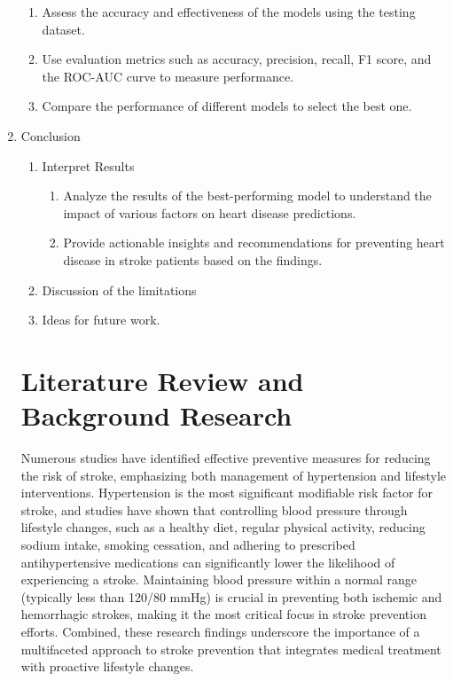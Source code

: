 \documentclass[runningheads]{llncs}
\begin{document}
\begin{enumerate}
\begin{enumerate}
    \item Assess the accuracy and effectiveness of the models using the testing dataset. 
    \item Use evaluation metrics such as accuracy, precision, recall, F1 score, and the ROC-AUC curve to measure performance. 
    \item Compare the performance of different models to select the best one. 
\end{enumerate}
\item Conclusion
\begin{enumerate}
    \item Interpret Results
        \begin{enumerate}
            \item Analyze the results of the best-performing model to understand the impact of various factors on heart disease predictions. 
            \item Provide actionable insights and recommendations for preventing heart disease in stroke patients based on the findings. 
        \end{enumerate}
\item Discussion of the limitations
\item Ideas for future work.
\end{enumerate}

\section{Literature Review and Background Research}
Numerous studies have identified effective preventive measures for reducing the risk of stroke, emphasizing both management of hypertension and lifestyle interventions. \cite{sirisha2021awareness} Hypertension is the most significant modifiable risk factor for stroke, and studies have shown that controlling blood pressure through lifestyle changes, such as a healthy diet, regular physical activity, reducing sodium intake, smoking cessation, and adhering to prescribed antihypertensive medications can significantly lower the likelihood of experiencing a stroke. Maintaining blood pressure within a normal range (typically less than 120/80 mmHg) is crucial in preventing both ischemic and hemorrhagic strokes, making it the most critical focus in stroke prevention efforts. \cite{doi:10.1161/STR.0000000000000375} Combined, these research findings underscore the importance of a multifaceted approach to stroke prevention that integrates medical treatment with proactive lifestyle changes.


\end{enumerate}
\end{document}
